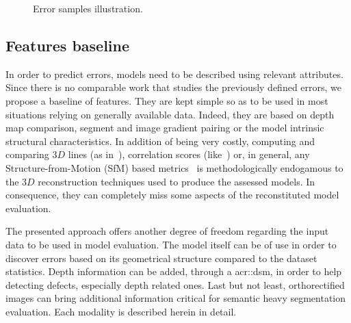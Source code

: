 \documentclass[runningheads]{llncs}
\newcounter{SubFigCounter}
\begin{document}
\begin{figure}
\begin{center}
{{                    \label{fig::fac_err}
                    \addtocounter{figure}{-1}
                }
            }
            {
                \caption{\label{fig::samples}Error samples illustration.}
            }
        \end{center}
        \vspace{-4.5em}
    \end{figure}

\subsection{Features baseline}
In order to predict errors, models need to be described using relevant attributes. Since there is no comparable work that studies the previously defined errors, we propose a baseline of features. They are kept simple so as to be used in most situations relying on generally available data. Indeed, they are based on depth map comparison, segment and image gradient pairing or the model intrinsic structural characteristics. In addition of being very costly, computing and comparing $3D$ lines (as in~\cite{Michelin2013}), correlation scores (like~\cite{boudet2006supervised}) or, in general, any Structure-from-Motion (SfM) based metrics~\cite{kowdle2011active} is methodologically endogamous to the $3D$ reconstruction techniques used to produce the assessed models. In consequence, they can completely miss some aspects of the reconstituted model evaluation.

The presented approach offers another degree of freedom regarding the input data to be used in model evaluation. The model itself can be of use in order to discover errors based on its geometrical structure compared to the dataset statistics. Depth information can be added, through a \acrshort{acr::dsm}, in order to help detecting defects, especially depth related ones. Last but not least, orthorectified images can bring additional information critical for semantic heavy segmentation evaluation. Each modality is described herein in detail.
\end{document}
